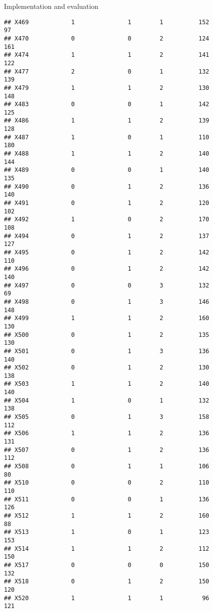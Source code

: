 \documentclass[
  ignorenonframetext,
]{beamer}
\begin{document}
\begin{frame}[fragile]{Implementation and evaluation}
\begin{verbatim}
## X469            1               1        1          152             97
## X470            0               0        2          124            161
## X474            1               1        2          141            122
## X477            2               0        1          132            139
## X479            1               1        2          130            148
## X483            0               0        1          142            125
## X486            1               1        2          139            128
## X487            1               0        1          110            180
## X488            1               1        2          140            144
## X489            0               0        1          140            135
## X490            0               1        2          136            140
## X491            0               1        2          120            102
## X492            1               0        2          170            108
## X494            0               1        2          137            127
## X495            0               1        2          142            110
## X496            0               1        2          142            140
## X497            0               0        3          132             69
## X498            0               1        3          146            148
## X499            1               1        2          160            130
## X500            0               1        2          135            130
## X501            0               1        3          136            140
## X502            0               1        2          130            138
## X503            1               1        2          140            140
## X504            1               0        1          132            138
## X505            0               1        3          158            112
## X506            1               1        2          136            131
## X507            0               1        2          136            112
## X508            0               1        1          106             80
## X510            0               0        2          110            110
## X511            0               0        1          136            126
## X512            1               1        2          160             88
## X513            1               0        1          123            153
## X514            1               1        2          112            150
## X517            0               0        0          150            132
## X518            0               1        2          150            120
## X520            1               1        1           96            121

\end{verbatim}
\end{frame}
\end{document}
